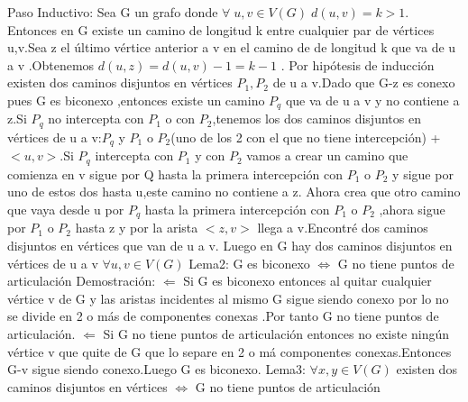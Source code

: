 \documentclass{article}
\begin{document}
    Paso Inductivo:\newline
    Sea G un grafo donde $\forall\; u,v\in V(G)\; d(u,v)=k>1$. Entonces en G existe un camino de longitud k entre 
    cualquier par de v\'ertices u,v.Sea z el \'ultimo v\'ertice anterior a v en el camino de de longitud k que va de
    u a v .Obtenemos $d(u,z)=d(u,v)-1=k-1$ . Por hip\'otesis de inducci\'on existen dos caminos disjuntos en v\'ertices 
    $P_{1},P_{2}$ de u a v.Dado que G-z es conexo pues G es biconexo ,entonces existe un camino $P_{q}$ que va de u a v
    y no contiene a z.Si $P_{q}$ no intercepta con $P_{1}$ o con $P_{2}$,tenemos los dos caminos disjuntos en v\'ertices
    de u a v:$P_{q}$ y $P_{1}$ o $P_{2}$(uno de los 2 con el que no tiene intercepci\'on) + $<u,v>$.Si $P_{q}$ intercepta 
    con $P_{1}$ y con $P_{2}$ vamos a crear un camino que comienza en v sigue por Q hasta la primera intercepci\'on con
    $P_{1}$ o $P_{2}$ y sigue por uno de estos dos hasta u,este camino no contiene a z. Ahora crea que otro camino que vaya 
    desde u por $P_{q}$ hasta la primera intercepci\'on con $P_{1}$ o $P_{2}$ ,ahora sigue por $P_{1}$ o $P_{2}$ hasta z 
    y por la arista $<z,v>$ llega a v.Encontr\'e dos caminos disjuntos en v\'ertices que van de u a v.\newline
    Luego en G hay dos caminos disjuntos en v\'ertices de u a v $\forall u,v \in V(G)$
    \newline
    \newline
    Lema2:\newline
    G es biconexo $\Longleftrightarrow$ G no tiene puntos de articulaci\'on \newline
    Demostraci\'on:\newline
    $\Longleftarrow$\newline
    Si G es biconexo entonces al quitar cualquier v\'ertice v de G y las aristas incidentes al mismo 
    G sigue siendo conexo por lo no se divide en 2 o m\'as de componentes conexas .Por tanto G no
    tiene puntos de articulaci\'on.\newline
    $\Longleftarrow$\newline
    Si G no tiene puntos de articulaci\'on entonces no existe ning\'un  v\'ertice v que quite de G que lo separe en
    2 o m\'a  componentes conexas.Entonces G-v sigue siendo conexo.Luego G es biconexo.
    \newline
    \newline
    Lema3:\newline
    $\forall x,y\in V(G)$ existen dos caminos disjuntos en v\'ertices $\Longleftrightarrow$ G no tiene puntos de articulaci\'on\newline
\end{document}
